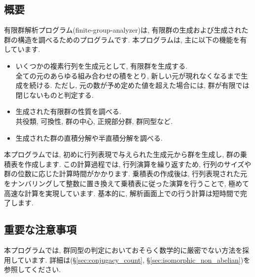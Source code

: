\documentclass[11pt, a4paper]{jsarticle}
\begin{document}
\subsection{概要}
有限群解析プログラム(finite-group-analyzer)は, 有限群の生成および生成された群の構造を調べるためのプログラムです.
本プログラムは, 主に以下の機能を有しています.
\begin{itemize}
\item いくつかの複素行列を生成元として, 有限群を生成する. \\
全ての元のあらゆる組み合わせの積をとり, 新しい元が現れなくなるまで生成を続ける.
ただし, 元の数が予め定めた値を超えた場合には, 群が有限では閉じないものと判定する.
\item 生成された有限群の性質を調べる. \\
共役類, 可換性, 群の中心, 正規部分群, 群同型など.
\item 生成された群の直積分解や半直積分解を調べる.
\end{itemize}
本プログラムでは, 初めに行列表現で与えられた生成元から群を生成し, 群の乗積表を作成します.
この計算過程では, 行列演算を繰り返すため, 行列のサイズや群の位数に応じた計算時間がかかります.
乗積表の作成後は, 行列表現された元をナンバリングして整数に置き換えて乗積表に従った演算を行うことで, 極めて高速な計算を実現しています.
基本的に, 解析画面上での行う計算は短時間で完了します.

\subsection{重要な注意事項}
本プログラムでは, 群同型の判定においておそらく数学的に厳密でない方法を採用しています.
詳細は(\S\ref{sec:conjugacy_count}, \S\ref{sec:isomorphic_non_abelian})を参照してください.
\end{document}
